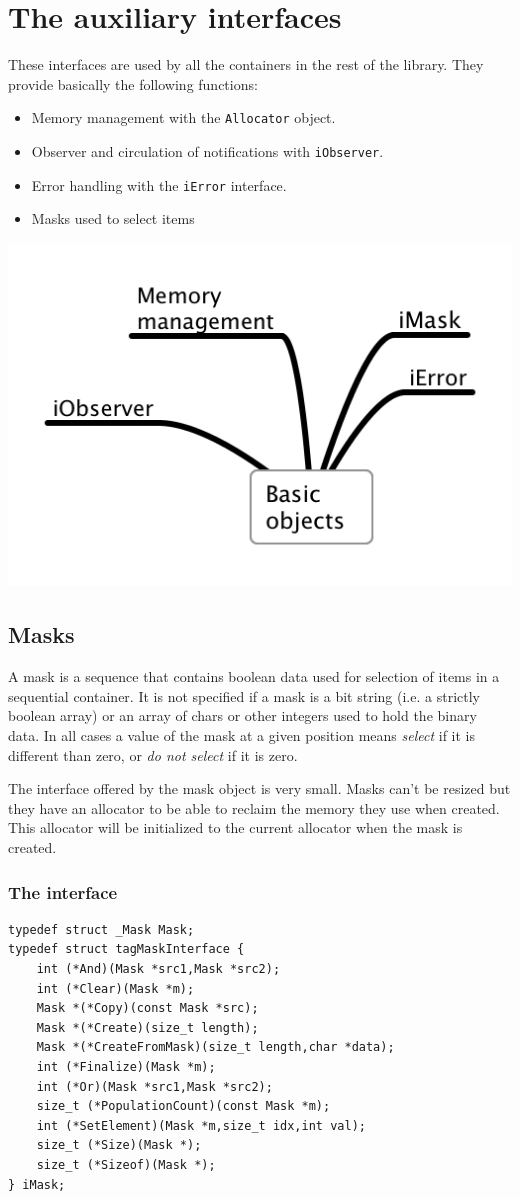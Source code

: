 \documentclass[12pt,a4paper]{memoir} %
\begin{document}
\chapter{The auxiliary interfaces}
These interfaces are used by all the containers in the rest of the library. They provide basically the following functions:
\begin{itemize}
\item Memory management with the \texttt{Allocator} object.
\item Observer and circulation of notifications with \texttt{iObserver}.
\item Error handling with the \texttt{iError} interface.
\item Masks used to select items
\end{itemize}
\includegraphics[scale=0.63]{Basic.png}
\section{Masks}
A mask is a sequence that contains boolean data used for selection of items in a sequential container. 
It is not specified if a mask is a bit string (i.e. a
strictly boolean array) or an array of chars or other integers used to hold the binary data. In all cases a value of the mask at a given position 
means \textsl{select} if it is different than zero, or \textsl{do not select} if it is zero.

The interface offered by the mask object is very small. Masks can't be resized but they have an allocator to be able to reclaim the
memory they use when created. This allocator will be initialized to the current allocator when the mask is created.
\subsection{The interface}
\begin{verbatim}
typedef struct _Mask Mask;
typedef struct tagMaskInterface {
    int (*And)(Mask *src1,Mask *src2);
    int (*Clear)(Mask *m);
    Mask *(*Copy)(const Mask *src);
    Mask *(*Create)(size_t length);
    Mask *(*CreateFromMask)(size_t length,char *data);
    int (*Finalize)(Mask *m);
    int (*Or)(Mask *src1,Mask *src2);
    size_t (*PopulationCount)(const Mask *m);
    int (*SetElement)(Mask *m,size_t idx,int val);
    size_t (*Size)(Mask *);
    size_t (*Sizeof)(Mask *);
} iMask;
\end{verbatim}
\end{document}
